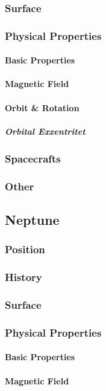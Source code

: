 \subsubsection{Surface}
\subsubsection{Physical Properties}
\paragraph{Basic Properties}
\paragraph{Magnetic Field}
\paragraph{Orbit \& Rotation}
\subparagraph{Orbital Exxentritet}
\subsubsection{Spacecrafts}
\subsubsection{Other}
\subsection{Neptune}

\subsubsection{Position}
\subsubsection{History}
\subsubsection{Surface}
\subsubsection{Physical Properties}
\paragraph{Basic Properties}
\paragraph{Magnetic Field}
